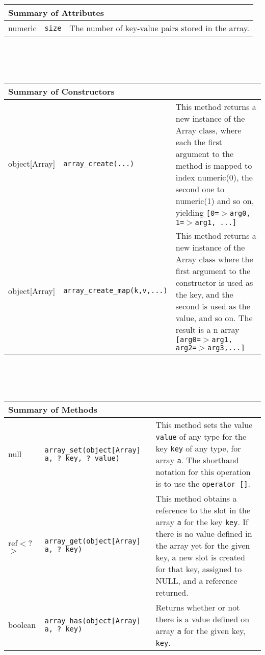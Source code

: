 \begin{tabular}{|p{0.8in}|p{2.2in}||p{3in}|}
  \hline
  \multicolumn{3}{|l|}{\textbf{Summary of Attributes}}\\
  \hline
  numeric & {\tt size} & The number of key-value pairs stored in the array.\\
  \hline
\end{tabular}\\
\\\ \\
\begin{tabular}{|p{0.8in}|p{2.2in}||p{3in}|}
  \hline
  \multicolumn{3}{|l|}{\textbf{Summary of Constructors}}\\
  \hline
  object[Array] & {\tt array\_create(...)} & This method returns a new instance of the Array class,
  where each the first argument to the method is mapped to index numeric(0), the second one to
  numeric(1) and so on, yielding {\tt [0=$>$arg0, 1=$>$arg1, ...]}\\
  object[Array] & {\tt array\_create\_map(k,v,...)} & This method returns a new instance of the Array
  class where the first argument to the constructor is used as the key, and the second is used
  as the value, and so on. The result is a n array {\tt [arg0=$>$arg1, arg2=$>$arg3,...] }\\
  \hline
\end{tabular}  \\
\\\ \\
\begin{tabular}{|p{0.8in}|p{2.2in}||p{3in}|}
  \hline
  \multicolumn{3}{|l|}{\textbf{Summary of Methods}}\\
  \hline
  null & {\tt array\_set(object[Array] a, ? key, ? value)} & This method sets the value {\tt value} of any
  type for the key {\tt key} of any type, for array {\tt a}. The shorthand notation for this operation
  is to use the {\tt operator []}.\\
  ref$<$?$>$ & {\tt array\_get(object[Array] a, ? key) } & This method obtains a reference to the slot in the
  array {\tt a} for the key {\tt key}. If there is no value defined in the array yet for the given key,
  a new slot is created for that key, assigned to NULL, and a reference returned.\\
  boolean & {\tt array\_has(object[Array] a, ? key)} & Returns whether or not there is a value defined
  on array {\tt a} for the given key, {\tt key}.\\
  \hline
\end{tabular}

